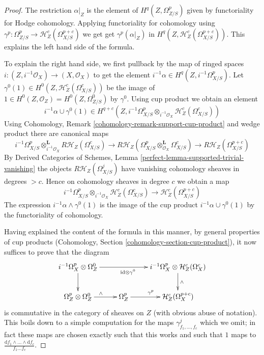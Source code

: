 \begin{proof}
The restriction $\alpha|_Z$ is the element of $H^q(Z, \Omega^p_{Z/S})$
given by functoriality for Hodge cohomology. Applying functoriality
for cohomology using
$\gamma^p : \Omega^p_{Z/S} \to \mathcal{H}^c_Z(\Omega^{p + c}_{X/S})$
we get get $\gamma^p(\alpha|_Z)$ in
$H^q(Z, \mathcal{H}^c_Z(\Omega^{p + c}_{X/S}))$.
This explains the left hand side of the formula.

\medskip\noindent
To explain the right hand side, we first pullback by the map
of ringed spaces $i : (Z, i^{-1}\mathcal{O}_X) \to (X, \mathcal{O}_X)$
to get the element $i^{-1}\alpha \in H^q(Z, i^{-1}\Omega^p_{X/S})$.
Let $\gamma^0(1) \in H^0(Z, \mathcal{H}_Z^c(\Omega^c_{X/S}))$
be the image of $1 \in H^0(Z, \mathcal{O}_Z) = H^0(Z, \Omega^0_{Z/S})$
by $\gamma^0$. Using cup product we obtain an element
$$
i^{-1}\alpha \cup \gamma^0(1)
\in
H^{q + c}(Z, 
i^{-1}\Omega^p_{X/S} \otimes_{i^{-1}\mathcal{O}_X}
\mathcal{H}^c_Z(\Omega^c_{X/S}))
$$
Using Cohomology, Remark \ref{cohomology-remark-support-cup-product}
and wedge product there are canonical maps
$$
i^{-1}\Omega^p_{X/S} \otimes_{i^{-1}\mathcal{O}_X}^\mathbf{L}
R\mathcal{H}_Z(\Omega^c_{X/S}) \to
R\mathcal{H}_Z(\Omega^p_{X/S} \otimes_{\mathcal{O}_X}^\mathbf{L}
\Omega^c_{X/S}) \to
R\mathcal{H}_Z(\Omega^{p + c}_{X/S})
$$
By Derived Categories of Schemes, Lemma
\ref{perfect-lemma-supported-trivial-vanishing}
the objects $R\mathcal{H}_Z(\Omega^j_{X/S})$ have vanishing
cohomology sheaves in degrees $> c$. Hence on cohomology
sheaves in degree $c$ we obtain a map
$$
i^{-1}\Omega^p_{X/S} \otimes_{i^{-1}\mathcal{O}_X}
\mathcal{H}^c_Z(\Omega^c_{X/S}) \longrightarrow
\mathcal{H}^c_Z(\Omega^{p + c}_{X/S})
$$
The expression $i^{-1}\alpha \wedge \gamma^0(1)$ is the image
of the cup product $i^{-1}\alpha \cup \gamma^0(1)$ by the
functoriality of cohomology.

\medskip\noindent
Having explained the content of the formula in this manner, by
general properties of cup products
(Cohomology, Section \ref{cohomology-section-cup-product}),
it now suffices to prove that the diagram
$$
\xymatrix{
i^{-1}\Omega^p_X \otimes \Omega^0_Z \ar[rr]_{\text{id} \otimes \gamma^0}
\ar[d] & &
i^{-1}\Omega^p_X \otimes \mathcal{H}^c_Z(\Omega^c_X) \ar[d]^\wedge \\
\Omega^p_Z \otimes \Omega^0_Z \ar[r]^\wedge &
\Omega^p_Z \ar[r]^{\gamma^p} &
\mathcal{H}^c_Z(\Omega^{p + c}_X)
}
$$
is commutative in the category of sheaves on $Z$ (with obvious abuse of
notation). This boils down to a simple computation for the maps
$\gamma^j_{f_1, \ldots, f_c}$ which we omit; in fact these maps
are chosen exactly such that this works and such that $1$ maps to
$\frac{\text{d}f_1 \wedge \ldots \wedge \text{d}f_c}{f_1 \ldots f_c}$.
\end{proof}

